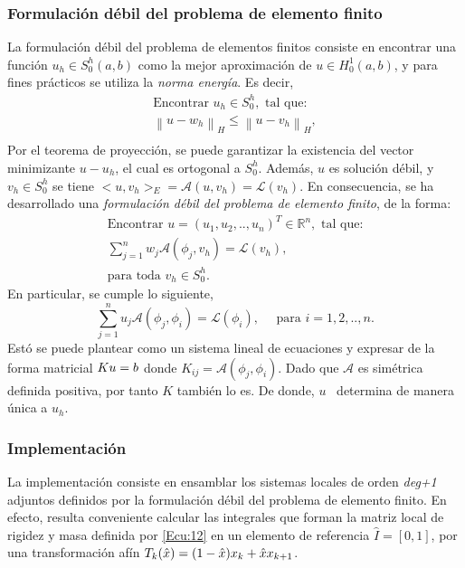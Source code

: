 \documentclass[12pt]{article}
\begin{document}
\subsubsection{Formulación débil del problema de elemento finito}
La formulación débil del problema de elementos finitos consiste en encontrar una función $\textit{u}_h \in S^h_0(a,b)$ como la mejor aproximación de $\textit{u} \in H^1_0(a,b)$, y para fines prácticos se utiliza la \textit{norma energía}. Es decir, 
\begin{equation}
\begin{array}{c}
\text{Encontrar } \textit{u}_h \in S^h_0, \text{ tal que:}\\
\left\| u- w_h\right \|_H \leq \left\| u-v_h\right\|_H,\\
\label{Ecu:20}
\end{array}
\end{equation}
Por el teorema de proyección, se puede garantizar la existencia del vector minimizante $u-u_h$, el cual es ortogonal a $S_0^h$. Además, $\textit{u}$ es solución débil, y $v_h \in S^h_0$ se tiene $
<u,v_h>_E = \mathcal{A}(u,v_h) = \mathcal{L}(v_h)$. En consecuencia, se ha desarrollado una \textit{formulación débil del problema de elemento finito}, de la forma: 
\begin{equation*}
\begin{array}{c}
\text{Encontrar } u = (u_1, u_2, . . , u_n)^T \in \mathbb{R}^n, \text{ tal que:}\\[0.3cm]
\sum_{j=1}^{n}w_j\mathcal{A}(\phi_j,v_h) =\mathcal{L}(v_h),\\[0.3cm]
\text{para toda } v_h \in S^h_0.
\label{Ecu:21}
\end{array}
\end{equation*}
En particular, se cumple lo siguiente,
\begin{equation*}
\sum_{j=1}^{n} u_j\mathcal{A}(\phi_j,\phi_i) =\mathcal{L}(\phi_i), \quad \text{ para } i=1,2,..,n.
\end{equation*}
Estó se puede plantear como un sistema lineal de ecuaciones y expresar de la forma matricial $\LARGE{Ku=b}$ donde $K_{ij}=\mathcal{A}(\phi_j,\phi_i)$. Dado que $\mathcal{A}$ es simétrica definida positiva, por tanto $K$ también lo es. De donde, $\textit{u} $ \ determina de manera única a $u_h$.

\subsubsection{Implementación}
La implementación consiste en ensamblar los sistemas locales de orden \textit{deg+1} adjuntos definidos por la formulación débil del problema de elemento finito. En efecto, resulta conveniente calcular las integrales que forman la matriz local de rigidez y masa definida por \eqref{Ecu:12} en un elemento de referencia $\hat{I}=[0,1]$, por una transformación afín $\LARGE{T}_{k}(\hat{x}) = (1-\hat{x})x_k + \hat{x}x_{k+1}$.
\end{document}
